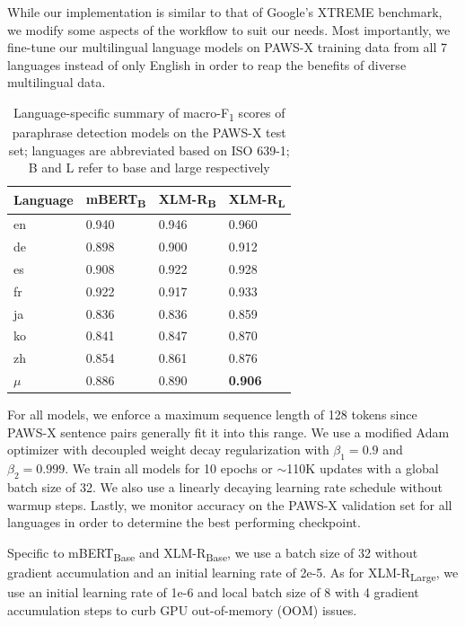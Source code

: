 \documentclass[11pt,a4paper]{article}
\begin{document}
While our implementation is similar to that of Google's XTREME benchmark, we modify some aspects of the workflow to suit our needs. Most importantly, we fine-tune our multilingual language models on PAWS-X training data from all 7 languages instead of only English in order to reap the benefits of diverse multilingual data.

\begin{table}
  \centering
  \begin{tabular}{llll}
    \hline
    \textbf{Language} & \textbf{mBERT\textsubscript{B}} & \textbf{XLM-R\textsubscript{B}} & \textbf{XLM-R\textsubscript{L}} \\
    \hline
    en & 0.940 & 0.946 & 0.960 \\
    de & 0.898 & 0.900 & 0.912 \\
    es & 0.908 & 0.922 & 0.928 \\
    fr & 0.922 & 0.917 & 0.933 \\
    ja & 0.836 & 0.836 & 0.859 \\
    ko & 0.841 & 0.847 & 0.870 \\
    zh & 0.854 & 0.861 & 0.876 \\
    \hline \hline
    $\mu$ & 0.886 & 0.890 & \textbf{0.906} \\
    \hline
  \end{tabular} 
  \caption{Language-specific summary of macro-F\textsubscript{1} scores of paraphrase detection models on the PAWS-X test set; languages are abbreviated based on ISO 639-1; B and L refer to base and large respectively}
  \label{pawsx_score_breakdown}
\end{table}

For all models, we enforce a maximum sequence length of 128 tokens since PAWS-X sentence pairs generally fit it into this range. We use a modified Adam optimizer with decoupled weight decay regularization \cite{DBLP:journals/corr/abs-1711-05101} with $\beta_1 = 0.9$ and $\beta_2=0.999$. We train all models for 10 epochs or $\sim$110K updates with a global batch size of 32. We also use a linearly decaying learning rate schedule without warmup steps. Lastly, we monitor accuracy on the PAWS-X validation set for all languages in order to determine the best performing checkpoint.

Specific to mBERT\textsubscript{Base} and XLM-R\textsubscript{Base}, we use a batch size of 32 without gradient accumulation and an initial learning rate of 2e-5. As for XLM-R\textsubscript{Large}, we use an initial learning rate of 1e-6 and local batch size of 8 with 4 gradient accumulation steps to curb GPU out-of-memory (OOM) issues.
\end{document}
